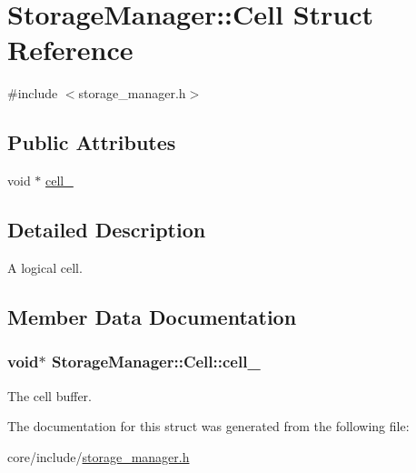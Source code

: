 \hypertarget{structStorageManager_1_1Cell}{}\section{Storage\+Manager\+:\+:Cell Struct Reference}
\label{structStorageManager_1_1Cell}


{\ttfamily \#include $<$storage\+\_\+manager.\+h$>$}

\subsection*{Public Attributes}
\begin{DoxyCompactItemize}
\item 
void $\ast$ \hyperlink{structStorageManager_1_1Cell_a3dc21ee38524e0d9c861169c44d5b888}{cell\+\_\+}
\end{DoxyCompactItemize}


\subsection{Detailed Description}
A logical cell. 

\subsection{Member Data Documentation}
\hypertarget{structStorageManager_1_1Cell_a3dc21ee38524e0d9c861169c44d5b888}{}
\subsubsection[{cell\+\_\+}]{\setlength{\rightskip}{0pt plus 5cm}void$\ast$ Storage\+Manager\+::\+Cell\+::cell\+\_\+}\label{structStorageManager_1_1Cell_a3dc21ee38524e0d9c861169c44d5b888}
The cell buffer. 

The documentation for this struct was generated from the following file\+:\begin{DoxyCompactItemize}
\item 
core/include/\hyperlink{storage__manager_8h}{storage\+\_\+manager.\+h}\end{DoxyCompactItemize}
